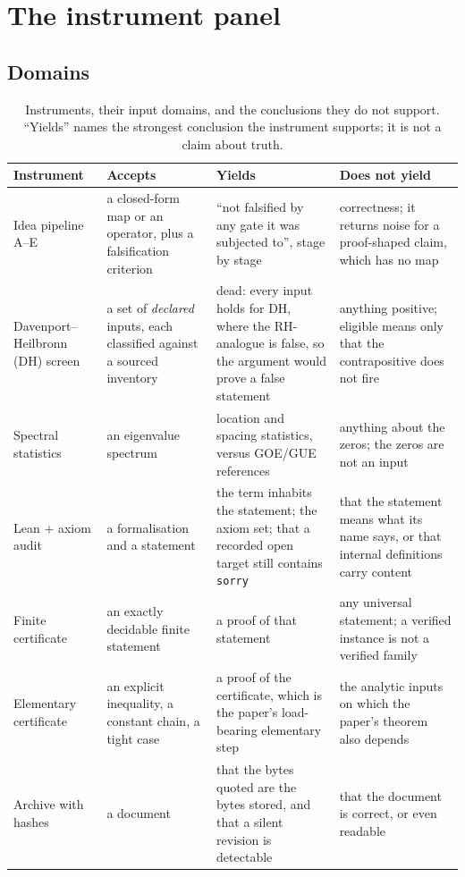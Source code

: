 \documentclass[11pt,a4paper]{article}
\newcommand{\verdict}[1]{\textsf{#1}}
\begin{document}
\section{The instrument panel}
\label{sec:instruments}

\subsection{Domains}

\begin{table}[t]
\centering
\caption{Instruments, their input domains, and the conclusions they do not support. ``Yields''
names the strongest conclusion the instrument supports; it is not a claim about truth.}
\label{tab:instruments}
\footnotesize
\begin{tabularx}{\textwidth}{@{}>{\raggedright\arraybackslash}p{2.55cm}>{\raggedright\arraybackslash}p{3.05cm}>{\raggedright\arraybackslash}X>{\raggedright\arraybackslash}p{3.5cm}@{}}
\toprule
Instrument & Accepts & Yields & Does not yield \\
\midrule
Idea pipeline A--E & a closed-form map or an operator, plus a falsification criterion &
  ``not falsified by any gate it was subjected to'', stage by stage &
  correctness; it returns noise for a proof-shaped claim, which has no map \\
\addlinespace
Davenport--Heilbronn (DH) screen & a set of \emph{declared} inputs, each classified against a
  sourced inventory & \verdict{dead}: every input holds for DH, where the RH-analogue is false,
  so the argument would prove a false statement & anything positive; \verdict{eligible} means
  only that the contrapositive does not fire \\
\addlinespace
Spectral statistics & an eigenvalue spectrum & location and spacing statistics, versus GOE/GUE
  references & anything about the zeros; the zeros are not an input \\
\addlinespace
Lean + axiom audit & a formalisation and a statement & the term inhabits the statement; the
  axiom set; that a recorded open target still contains \texttt{sorry} &
  that the statement means what its name says, or that internal definitions carry content \\
\addlinespace
Finite certificate & an exactly decidable finite statement & a proof of that statement &
  any universal statement; a verified instance is not a verified family \\
\addlinespace
Elementary certificate & an explicit inequality, a constant chain, a tight case & a proof of
  the certificate, which is the paper's load-bearing elementary step & the analytic inputs on
  which the paper's theorem also depends \\
\addlinespace
Archive with hashes & a document & that the bytes quoted are the bytes stored, and that a
  silent revision is detectable & that the document is correct, or even readable \\
\bottomrule
\end{tabularx}
\end{table}
\end{document}
